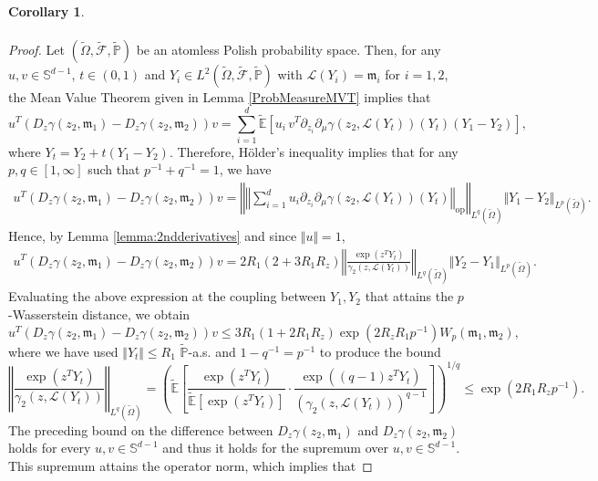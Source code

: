 \documentclass{article}
\newtheorem{corollary}[theorem]{Corollary}
\begin{document}
\begin{appendices}
\begin{corollary}
\begin{align*}
\end{align*}
\end{corollary}
\begin{proof}
Let $(\widetilde{\Omega},\widetilde{\mathcal F},\widetilde{\mathbb P})$ be an atomless Polish probability space. Then, for any $u,v \in \mathbb S^{d-1}$, $t\in(0,1)$ and $Y_i\in L^2(\widetilde{\Omega},\widetilde{\mathcal F},\widetilde{\mathbb P})$ with $\mathcal L(Y_i)=\mathfrak{m}_i$ for $i=1,2$, the Mean Value Theorem given in Lemma \ref{ProbMeasureMVT} implies that 
\[
u^T\left(D_{z}\gamma(z_2,\mathfrak{m}_1)-D_{z}\gamma(z_2,\mathfrak{m}_2)\right)v = \sum_{i=1}^d\widetilde{\mathbb E} \left[u_i\, v^T\partial_{z_i}\partial_\mu \gamma(z_2,\mathcal L(Y_t))(Y_t)(Y_1-Y_2) \right] ,
\]
where $Y_t=Y_2+t(Y_1-Y_2)$. Therefore, H\"older's inequality implies that for any $p,q\in [1,\infty]$ such that $p^{-1}+q^{-1}=1$, we have 
\begin{align*}
   u^T\left( D_{z}\gamma(z_2,\mathfrak{m}_1)-D_{z}\gamma(z_2,\mathfrak{m}_2)\right)v = \left\Vert \left\Vert \sum_{i=1}^du_i \partial_{z_i}\partial_\mu \gamma(z_2,\mathcal L(Y_t))(Y_t)\right\Vert_\mathrm{op}\right\Vert_{L^q(\widetilde{\Omega})} \Vert Y_1-Y_2\Vert_{L^p(\widetilde{\Omega})}.
\end{align*}
Hence, by Lemma \ref{lemma:2ndderivatives} and since $\Vert u \Vert =1$,
\begin{align*}
    u^T\left( D_{z}\gamma(z_2,\mathfrak{m}_1)-D_{z}\gamma(z_2,\mathfrak{m}_2)\right)v = 2R_1(2+3R_1R_z)\left\Vert \frac{\exp(z^TY_t)}{\gamma_2\left(z,\mathcal L(Y_t)\right)}\right\Vert_{L^q(\widetilde{\Omega})} \Vert  Y_2-Y_1\Vert_{L^p(\widetilde{\Omega})}.
\end{align*}
Evaluating the above expression at the coupling between $Y_1,Y_2$ that attains the $p$-Wasserstein distance,  we obtain
\begin{equation*}
    u^T\left(D_z\gamma(z_2,\mathfrak{m}_1)-D_{z}\gamma(z_2,\mathfrak{m}_2)\right)v\le 3R_1(1+2R_1R_z) \exp(2R_zR_1p^{-1}) W_p(\mathfrak{m}_1,\mathfrak{m}_2),
\end{equation*}
 where we have used $\Vert Y_t\Vert \le R_1 $ $\widetilde{\mathbb P}$-a.s. and  $1-q^{-1}=p^{-1}$ to produce the bound $$\left\Vert \frac{\exp(z^TY_t)}{\gamma_2(z,\mathcal L(Y_t))}\right\Vert_{L^q(\widetilde{\Omega})}=\left(\widetilde{\mathbb E}\left[\frac{\exp(z^TY_t)}{\widetilde{\mathbb E}\left[\exp(z^TY_t)\right]}\cdot \frac{\exp((q-1)z^TY_t)}{(\gamma_2(z,\mathcal L(Y_t)))^{q-1}}\right]\right)^{1/q}\le \exp\left(2R_1R_zp^{-1}\right).$$ 
 The preceding bound on the difference between $D_z\gamma(z_2,\mathfrak{m}_1)$ and $D_z\gamma(z_2,\mathfrak{m}_2)$ holds for every $u,v\in\mathbb S^{d-1}$ and thus it holds for the supremum over $u,v\in\mathbb S^{d-1}$. This supremum attains the operator norm, which implies that

\end{proof}
\end{appendices}
\end{document}
